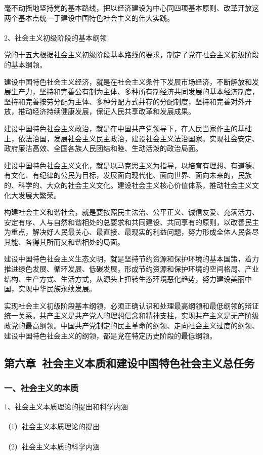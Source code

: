 \documentclass{ctexart}
\begin{document}
毫不动摇地坚持党的基本路线，把以经济建设为中心同四项基本原则、改革开放这两个基本点统一于建设中国特色社会主义的伟大实践。
\\\\

2、社会主义初级阶段的基本纲领

党的十五大根据社会主义初级阶段基本路线的要求，制定了党在社会主义初级阶段的基本纲领。

建设中国特色社会主义经济，就是在社会主义条件下发展市场经济，不断解放和发展生产力，坚持和完善公有制为主体、多种所有制经济共同发展的基本经济制度，坚持和完善按劳分配为主体、多种分配方式并存的分配制度，坚持和完善对外开放，推动经济持续健康发展，保证人民共享改革和发展成果。

建设中国特色社会主义政治，就是在中国共产党领导下，在人民当家作主的基础上，依法治国，发展社会主义民主政治，建设社会主义法治国家。实现社会安定、政府廉洁高效、全国各族人民团结和睦、生动活泼的政治局面。

建设中国特色社会主义文化，就是以马克思主义为指导，以培育有理想、有道德、有文化、有纪律的公民为目标，发展面向现代化、面向世界、面向未来的，民族的、科学的、大众的社会主义文化。建设社会主义核心价值体系，推动社会主义文化大发展大繁荣。

构建社会主义和谐社会，就是要按照民主法治、公平正义、诚信友爱、充满活力、安定有序、人与自然和谐相处的总要求和共同建设、共同享有的原则，以改善民主为重点，解决好人民最关心、最直接、最现实的利益问题，努力形成全体人民各尽其能、各得其所而又和谐相处的局面。

建设中国特色社会主义生态文明，就是坚持节约资源和保护环境的基本国策，着力推进绿色发展、循环发展、低碳发展，形成节约资源和保护环境的空间格局、产业结构、生产方式、生活方式，从源头上扭转生态环境恶化趋势，努力建设美丽中国，实现中华民族永续发展。

实现社会主义初级阶段基本纲领，必须正确认识和处理最高纲领和最低纲领的辩证统一关系。共产主义是共产党人的理想信念和精神支柱，实现共产主义是无产阶级政党的最高纲领。中国共产党制定的民主革命的纲领、走向社会主义过度的纲领、建设中国特色社会主义的纲领，都是党在特定历史阶段的最低纲领。

\subsection{第六章\ 社会主义本质和建设中国特色社会主义总任务}
\subsubsection{一、社会主义的本质}
1、社会主义本质理论的提出和科学内涵
\\\\
（1）社会主义本质理论的提出
\\\\
（2）社会主义本质的科学内涵
\\\\
\end{document}
